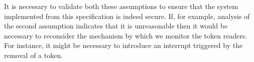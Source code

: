 It is necessary to validate both these assumptions to ensure that the 
system implemented from this specification is indeed secure. 
If, for example, analysis of the second assumption indicates that 
it is unreasonable then 
it would be necessary to reconsider the mechanism by which we monitor 
the token readers. For instance, it might be necessary to introduce an 
interrupt triggered by the removal of a token.

